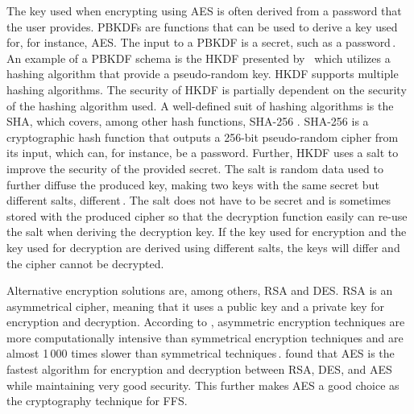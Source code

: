 The key used when encrypting using \gls{AES} is often derived from a password that the user provides. \gls{PBKDF}s are functions that can be used to derive a key used for, for instance, \gls{AES}. The input to a \gls{PBKDF} is a secret, such as a password\,\cite{kodwaniSecurityKeyDerivation2021}. An example of a \gls{PBKDF} schema is the \gls{HKDF} presented by \citeauthor{krawczykCryptographicExtractionKey2010}\,\cite{krawczykCryptographicExtractionKey2010}\cite{krawczykHMACbasedExtractandExpandKey2010} which utilizes a hashing algorithm that provide a \mbox{pseudo-random} key. \gls{HKDF} supports multiple hashing algorithms. The security of \gls{HKDF} is partially dependent on the security of the hashing algorithm used. A \mbox{well-defined} suit of hashing algorithms is the \gls{SHA}, which covers, among other hash functions, \gls{SHA}-256 \cite{hansenUSSecureHash2011}. \gls{SHA}-256 is a cryptographic hash function that outputs a \mbox{256-bit} \mbox{pseudo-random} cipher from its input, which can, for instance, be a password. Further, \gls{HKDF} uses a salt to improve the security of the provided secret. The salt is random data used to further diffuse the produced key, making two keys with the same secret but different salts, different\,\cite{ariasAddingSaltHashing2021}. The salt does not have to be secret and is sometimes stored with the produced cipher so that the decryption function easily can \mbox{re-use} the salt when deriving the decryption key. If the key used for encryption and the key used for decryption are derived using different salts, the keys will differ and the cipher cannot be decrypted.

Alternative encryption solutions are, among others, \gls{RSA} and \gls{DES}. \gls{RSA} is an asymmetrical cipher, meaning that it uses a public key and a private key for encryption and decryption. According to \citeauthor{mahajanStudyEncryptionAlgorithms2013}, asymmetric encryption techniques are more computationally intensive than symmetrical encryption techniques and are almost 1\,000 times slower than symmetrical techniques\,\cite{mahajanStudyEncryptionAlgorithms2013}. \citeauthor{mahajanStudyEncryptionAlgorithms2013} found that \gls{AES} is the fastest algorithm for encryption and decryption between \gls{RSA}, \gls{DES}, and \gls{AES} while maintaining very good security. This further makes \gls{AES} a good choice as the cryptography technique for \gls{FFS}.
